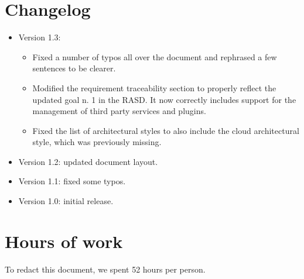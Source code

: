  \begin{appendices}

\chapter{Changelog}
\begin{itemize}
	\item Version 1.3:
	\begin{itemize}
		\item Fixed a number of typos all over the document and rephrased a few sentences to be clearer. 
		\item Modified the requirement traceability section to properly reflect the updated goal n. 1 in the RASD. It now correctly includes support for the management of third party services and plugins.
		\item Fixed the list of architectural styles to also include the cloud architectural style, which was previously missing.
	\end{itemize}
	\item Version 1.2: updated document layout.
	\item Version 1.1: fixed some typos.
	\item Version 1.0: initial release.
\end{itemize}

\chapter{Hours of work}
To redact this document, we spent 52 hours per person.



\end{appendices}